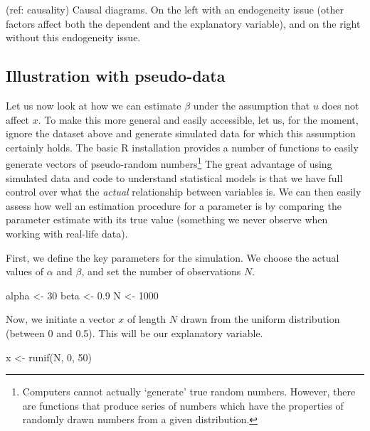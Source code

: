 \documentclass[
  12pt,
]{style/krantz}
\newenvironment{Shaded}{\begin{snugshade}}{\end{snugshade}}
\newcommand{\DecValTok}[1]{\textcolor[rgb]{0.00,0.00,0.81}{#1}}
\newcommand{\FloatTok}[1]{\textcolor[rgb]{0.00,0.00,0.81}{#1}}
\newcommand{\FunctionTok}[1]{\textcolor[rgb]{0.00,0.00,0.00}{#1}}
\newcommand{\NormalTok}[1]{#1}
\newcommand{\OtherTok}[1]{\textcolor[rgb]{0.56,0.35,0.01}{#1}}
\begin{document}
(ref: causality) Causal diagrams. On the left with an endogeneity issue (other factors affect both the dependent and the explanatory variable), and on the right without this endogeneity issue.

\hypertarget{illustration-with-pseudo-data}{%
\subsection{Illustration with pseudo-data}\label{illustration-with-pseudo-data}}

Let us now look at how we can estimate \(\beta\) under the assumption that \(u\) does not affect \(x\). To make this more general and easily accessible, let us, for the moment, ignore the dataset above and generate simulated data for which this assumption certainly holds. The basic R installation provides a number of functions to easily generate vectors of pseudo-random numbers\footnote{Computers cannot actually `generate' true random numbers. However, there are functions that produce series of numbers which have the properties of randomly drawn numbers from a given distribution.} The great advantage of using simulated data and code to understand statistical models is that we have full control over what the \emph{actual} relationship between variables is. We can then easily assess how well an estimation procedure for a parameter is by comparing the parameter estimate with its true value (something we never observe when working with real-life data).

First, we define the key parameters for the simulation. We choose the actual values of \(\alpha\) and \(\beta\), and set the number of observations \(N\).

\begin{Shaded}
\begin{Highlighting}[]
\NormalTok{alpha }\OtherTok{\textless{}{-}} \DecValTok{30}
\NormalTok{beta }\OtherTok{\textless{}{-}} \FloatTok{0.9}
\NormalTok{N }\OtherTok{\textless{}{-}} \DecValTok{1000}
\end{Highlighting}
\end{Shaded}

Now, we initiate a vector \(x\) of length \(N\) drawn from the uniform distribution (between 0 and 0.5). This will be our explanatory variable.

\begin{Shaded}
\begin{Highlighting}[]
\NormalTok{x }\OtherTok{\textless{}{-}} \FunctionTok{runif}\NormalTok{(N, }\DecValTok{0}\NormalTok{, }\DecValTok{50}\NormalTok{)}
\end{Highlighting}
\end{Shaded}
\end{document}

